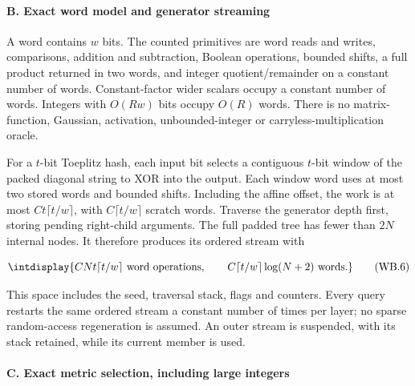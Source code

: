 \paragraph{B. Exact word model and generator streaming}

\mbox{}\par\smallskip


A word contains \(w\) bits. The counted primitives are word reads and writes, comparisons, addition and subtraction, Boolean operations, bounded shifts, a full product returned in two words, and integer quotient/remainder on a constant number of words. Constant-factor wider scalars occupy a constant number of words. Integers with \(O(Rw)\) bits occupy \(O(R)\) words. There is no matrix-function, Gaussian, activation, unbounded-integer or carryless-multiplication oracle.



For a \(t\)-bit Toeplitz hash, each input bit selects a contiguous \(t\)-bit window of the packed diagonal string to XOR into the output. Each window word uses at most two stored words and bounded shifts. Including the affine offset, the work is at most \(Ct\lceil t/w\rceil\), with \(C\lceil t/w\rceil\) scratch words. Traverse the generator depth first, storing pending right-child arguments. The full padded tree has fewer than \(2N\) internal nodes. It therefore produces its ordered stream with


\begingroup\renewcommand{\theHequation}{intdisplay.786}
\begin{equation}
\intdisplay{
CNt\lceil t/w\rceil\text{ word operations},\qquad
C\lceil t/w\rceil\log(N+2)\text{ words}.
}
\tag{WB.6}
\label{int:eq-0378-wb-6}
\end{equation}
\endgroup


This space includes the seed, traversal stack, flags and counters. Every query restarts the same ordered stream a constant number of times per layer; no sparse random-access regeneration is assumed. An outer stream is suspended, with its stack retained, while its current member is used.


\paragraph{C. Exact metric selection, including large integers}

